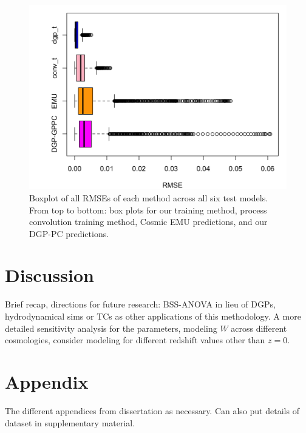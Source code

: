 \documentclass[11pt]{article}
\begin{document}
\begin{figure}[ht]
    \centering
    \includegraphics[width=6in]{rmse_box.png}
    \caption{Boxplot of all RMSEs of each method across all six test models. From top to bottom: box plots for our training method, process convolution training method, Cosmic EMU predictions, and our DGP-PC predictions.}
    \label{fig:plot_rmse_box}
\end{figure}

\section{Discussion}
\label{sec:disc}

Brief recap, directions for future research: BSS-ANOVA in lieu of DGPs, hydrodynamical sims or TCs as other applications of this methodology. A more detailed sensitivity analysis for the parameters, modeling $W$ across different cosmologies, consider modeling for different redshift values other than $z=0$.

\section{Appendix}
\label{sec:apdx}

The different appendices from dissertation as necessary. Can also put details of dataset in supplementary material.



\end{document}
